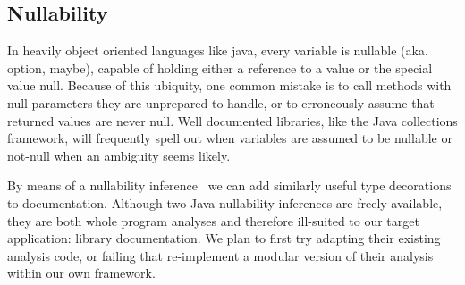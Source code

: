 \subsection{Nullability}
\label{sec:Nullability}

In heavily object oriented languages like java, every variable is nullable
(aka. option, maybe), capable of holding either a reference to a value or the
special value null.  Because of this ubiquity, one common mistake is to call
methods with null parameters they are unprepared to handle, or to erroneously
assume that returned values are never null.  Well documented libraries, like
the Java collections framework, will frequently spell out when variables are
assumed to be nullable or not-null when an ambiguity seems likely.

By means of a nullability inference~\cite{NIT,NonNullTypeInference} we can add
similarly useful type decorations to documentation.  Although two Java
nullability inferences are freely available, they are both whole program
analyses and therefore ill-suited to our target application: library
documentation.  We plan to first try adapting their existing analysis code, or
failing that re-implement a modular version of their analysis within our own
framework.

